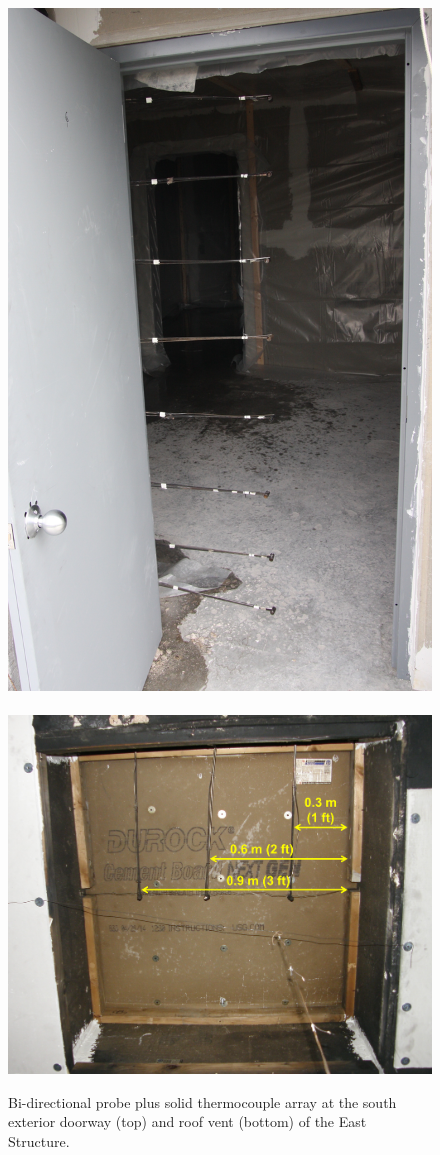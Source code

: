 \documentclass[12pt,oneside]{book}
\begin{document}
\begin{figure}[!ht]
	\includegraphics[width=0.45\columnwidth]{../Figures/Pictures/doorway_BDPs}
	\\~\\
	\includegraphics[width=0.65\columnwidth]{../Figures/Pictures/roof_vent_BDPs}
	\caption[Bi-directional probe plus solid thermocouple arrays in East Structure.]{Bi-directional probe plus solid thermocouple array at the south exterior doorway (top) and roof vent (bottom) of the East Structure.}
	\label{fig:BDP_arrays}
\end{figure}

\clearpage
\end{document}
